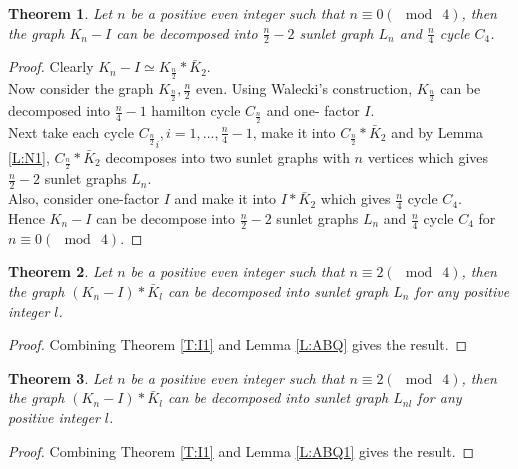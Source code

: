 \documentclass[12pt]{report}
\newtheorem{thm}{Theorem}[section]
\begin{document}
\begin{thm}
Let $n$ be a positive even integer such that $n\equiv 0(\mod\ 4)$,
then the graph $K_n-I$ can be decomposed into $\frac{n}{2}-2$ sunlet
graph $L_n$ and $\frac{n}{4}$ cycle $C_4$.
\end{thm}
\begin{proof}
Clearly $K_n-I\simeq K_{\frac{n}{2}}*\bar{K}_{2}$.\\
Now consider the graph $K_{\frac{n}{2}},\frac{n}{2}$ even. Using Walecki's construction, $K_{\frac{n}{2}}$ can be decomposed into $\frac{n}{4}-1$ hamilton cycle $C_{\frac{n}{2}}$ and one- factor $I$.\\
Next take each cycle ${C_{\frac{n}{2}}}_i,i=1,...,\frac{n}{4}-1$, make it into  $C_{\frac{n}{2}}*\bar{K}_{2}$ and by Lemma \ref{L:N1}, $C_{\frac{n}{2}}*\bar{K}_{2}$  decomposes into two sunlet graphs with $n$ vertices which gives $\frac{n}{2}-2$ sunlet graphs $L_n$.\\
Also, consider one-factor $I$ and make it into $I*\bar{K}_{2}$ which gives $\frac{n}{4}$ cycle $C_4$.\\
Hence $K_n-I$ can be decompose into $\frac{n}{2}-2$ sunlet graphs
$L_n$ and $\frac{n}{4}$ cycle $C_4$ for $n\equiv 0(\mod\ 4)$.
\end{proof}
\begin{thm}\label{T:I2}
Let $n$ be a positive even integer such that $n\equiv 2(\mod \ 4)$,
then the graph $(K_n-I)*\bar{K}_{l}$ can be decomposed into sunlet
graph $L_n$  for any positive integer $l$.
\end{thm}
\begin{proof}
Combining Theorem \ref{T:I1} and Lemma \ref{L:ABQ} gives the result.
\end{proof}
\begin{thm}
Let $n$ be a positive even integer such that $n\equiv 2(\mod\ 4)$,
then the graph $(K_n-I)*\bar{K}_{l}$ can be decomposed into sunlet
graph $L_{nl}$ for any positive integer $l$.
\end{thm}
\begin{proof}
Combining Theorem \ref{T:I1} and Lemma \ref{L:ABQ1} gives the
result.
\end{proof}
\end{document}
